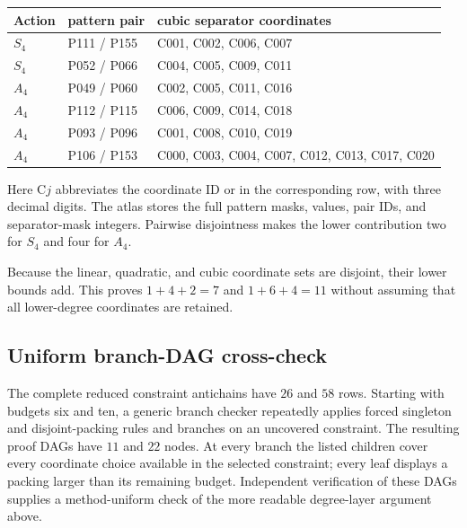 \begin{center}
\small
\begin{tabularx}{\textwidth}{>{\raggedright\arraybackslash}p{}>{\raggedright\arraybackslash}p{}>{\raggedright\arraybackslash}X}
\toprule
Action & pattern pair & cubic separator coordinates\\
\midrule
$S_4$ & P111 / P155 & C001, C002, C006, C007\\
$S_4$ & P052 / P066 & C004, C005, C009, C011\\
\midrule
$A_4$ & P049 / P060 & C002, C005, C011, C016\\
$A_4$ & P112 / P115 & C006, C009, C014, C018\\
$A_4$ & P093 / P096 & C001, C008, C010, C019\\
$A_4$ & P106 / P153 & C000, C003, C004, C007, C012, C013, C017, C020\\
\bottomrule
\end{tabularx}
\end{center}

Here C$j$ abbreviates the coordinate ID  or
 in the corresponding row, with three decimal digits.  The
atlas stores the full pattern masks, values, pair IDs, and separator-mask
integers.  Pairwise disjointness makes the lower contribution two for $S_4$
and four for $A_4$.

Because the linear, quadratic, and cubic coordinate sets are disjoint, their
lower bounds add.  This proves $1+4+2=7$ and $1+6+4=11$ without assuming that
all lower-degree coordinates are retained.

\subsection{Uniform branch-DAG cross-check}

The complete reduced constraint antichains have $26$ and $58$ rows.  Starting
with budgets six and ten, a generic branch checker repeatedly applies forced
singleton and disjoint-packing rules and branches on an uncovered constraint.
The resulting proof DAGs have $11$ and $22$ nodes.  At every branch the listed
children cover every coordinate choice available in the selected constraint;
every leaf displays a packing larger than its remaining budget.  Independent
verification of these DAGs supplies a method-uniform check of the more
readable degree-layer argument above.
